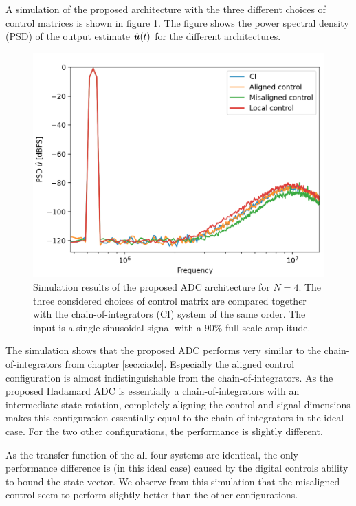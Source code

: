 A simulation of the proposed architecture with the three different choices of control matrices is shown in figure \ref{fig:HCI_SIM1}. The figure shows the power spectral density (PSD) of the output estimate $\hat{\bm{u}}(t)$ for the different architectures.
\begin{figure}[htbp]
    \centering
    \includegraphics[width=\linewidth]{figures/05hadamard/ideal_sim.png}
    \caption{Simulation results of the proposed ADC architecture for $N=4$. The three considered choices of control matrix are compared together with the chain-of-integrators (CI) system of the same order. The input is a single sinusoidal signal with a $90\%$ full scale amplitude. }
    \label{fig:HCI_SIM1}
\end{figure}
The simulation shows that the proposed ADC performs very similar to the chain-of-integrators from chapter \ref{sec:ciadc}. Especially the aligned control configuration is almost indistinguishable from the chain-of-integrators. As the proposed Hadamard ADC is essentially a chain-of-integrators with an intermediate state rotation, completely aligning the control and signal dimensions makes this configuration essentially equal to the chain-of-integrators in the ideal case. For the two other configurations, the performance is slightly different.

As the transfer function of the all four systems are identical, the only performance difference is (in this ideal case) caused by the digital controls ability to bound the state vector. We observe from this simulation that the misaligned control seem to perform slightly better than the other configurations.

